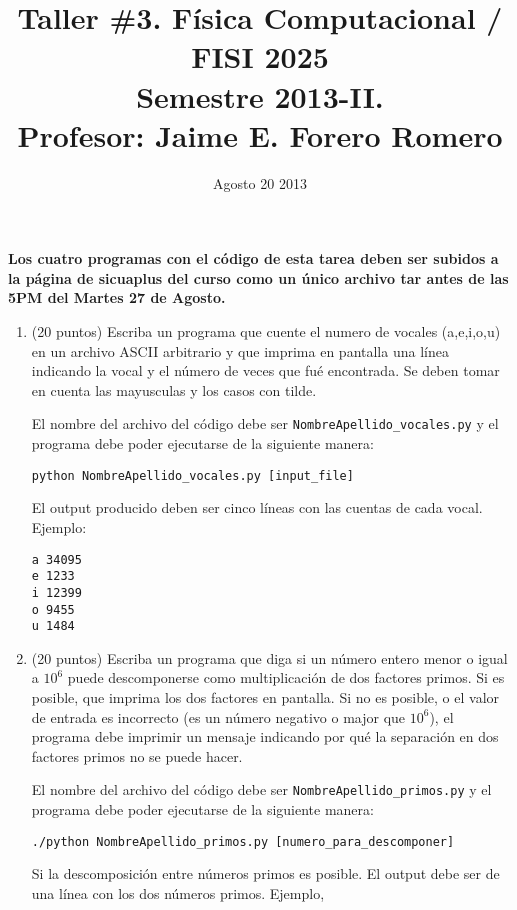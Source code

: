\documentclass{article}
\title{Taller \#3. F\'isica Computacional / FISI 2025 \\Semestre 2013-II. \\ Profesor: Jaime E. Forero Romero}
\date{Agosto 20 2013}
\begin{document}
\maketitle

{\bf Los cuatro programas con el c\'odigo de esta tarea deben ser subidos a la p\'agina de sicuaplus del curso como un \'unico archivo tar antes de las 5PM del Martes 27 de Agosto.}

\begin{enumerate}


\item (20 puntos) Escriba un programa que cuente el numero de vocales (a,e,i,o,u) en un archivo ASCII arbitrario y que imprima en pantalla una l\'inea indicando la vocal y el n\'umero de veces que fu\'e encontrada. Se deben tomar en cuenta las mayusculas y los casos con tilde.

El nombre del archivo del c\'odigo debe ser \verb"NombreApellido_vocales.py" y el programa debe poder ejecutarse de la siguiente manera:

\begin{verbatim}
python NombreApellido_vocales.py [input_file]
\end{verbatim}

El output producido deben ser cinco l\'ineas con las cuentas de cada vocal. Ejemplo:

\begin{verbatim}
a 34095
e 1233
i 12399
o 9455
u 1484
\end{verbatim}

\item (20 puntos) Escriba un programa que diga si un n\'umero entero menor o igual a $10^6$ puede descomponerse como multiplicaci\'on de dos factores primos. Si es posible, que imprima los dos factores en pantalla. Si no es posible, o el valor de entrada es incorrecto (es un n\'umero negativo o major que $10^6$), el programa debe imprimir un mensaje indicando por qu\'e la separaci\'on en dos factores primos no se puede hacer.


El nombre del archivo del c\'odigo debe ser \verb"NombreApellido_primos.py" y el programa debe poder ejecutarse de la siguiente manera:

\begin{verbatim}
./python NombreApellido_primos.py [numero_para_descomponer]
\end{verbatim}

Si la descomposici\'on entre n\'umeros primos es posible. El output debe ser de una l\'inea con los dos n\'umeros primos. Ejemplo,


\end{enumerate}
\end{document}
